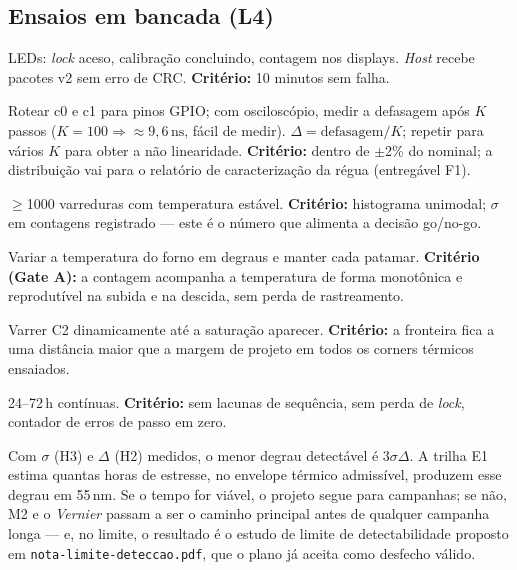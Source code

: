 \documentclass[11pt,a4paper]{article}
\newcommand{\ns}{\ensuremath{\,\mathrm{ns}}\xspace}
\newcommand{\file}[1]{\texttt{\small #1}}
\begin{document}
\subsection{Ensaios em bancada (L4)}

\begin{description}[leftmargin=0.9cm,style=nextline]
  \item[H1 --- \emph{Bring-up}] LEDs: \emph{lock} aceso, calibração concluindo, contagem nos
        displays. \emph{Host} recebe pacotes v2 sem erro de CRC. \textbf{Critério:} 10 minutos sem
        falha.
  \item[H2 --- Medição do passo] Rotear c0 e c1 para pinos GPIO; com osciloscópio, medir a
        defasagem após $K$ passos ($K=100 \Rightarrow \approx 9{,}6\ns$, fácil de medir).
        $\Delta = \text{defasagem}/K$; repetir para vários $K$ para obter a não linearidade.
        \textbf{Critério:} dentro de $\pm$2\% do nominal; a distribuição vai para o relatório de
        caracterização da régua (entregável F1).
  \item[H3 --- Repetibilidade] $\geq$1000 varreduras com temperatura estável.
        \textbf{Critério:} histograma unimodal; $\sigma$ em contagens registrado --- este é o
        número que alimenta a decisão go/no-go.
  \item[H4 --- Rastreamento] Variar a temperatura do forno em degraus e manter cada patamar.
        \textbf{Critério (Gate A):} a contagem acompanha a temperatura de forma monotônica e
        reprodutível na subida e na descida, sem perda de rastreamento.
  \item[H5 --- Fronteira do \emph{catcher}] Varrer C2 dinamicamente até a saturação aparecer.
        \textbf{Critério:} a fronteira fica a uma distância maior que a margem de projeto em todos
        os corners térmicos ensaiados.
  \item[H6 --- Estabilidade de longa duração] 24--72\,h contínuas. \textbf{Critério:} sem lacunas de
        sequência, sem perda de \emph{lock}, contador de erros de passo em zero.
\end{description}

\begin{keybox}[title={O critério de go/no-go científico}]
Com $\sigma$ (H3) e $\Delta$ (H2) medidos, o menor degrau detectável é $3\sigma\Delta$. A trilha E1
estima quantas horas de estresse, no envelope térmico admissível, produzem esse degrau em 55\,nm.
Se o tempo for viável, o projeto segue para campanhas; se não, M2 e o \emph{Vernier} passam a ser o
caminho principal antes de qualquer campanha longa --- e, no limite, o resultado é o estudo de
limite de detectabilidade proposto em \file{nota-limite-deteccao.pdf}, que o plano já aceita como
desfecho válido.
\end{keybox}
\end{document}
